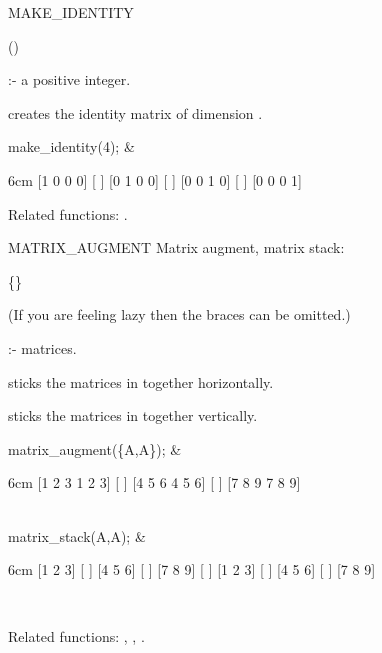 \begin{Operator}[makeidentity]{MAKE_IDENTITY}

\begin{Syntax}
()
\end{Syntax}

 :- a positive integer.

 creates the identity matrix of dimension 
.

\begin{Examples}

make_identity(4); &
\begin{multilineoutput}{6cm}
[1  0  0  0]
[          ]
[0  1  0  0]
[          ]
[0  0  1  0]
[          ]
[0  0  0  1]
\end{multilineoutput}

\end{Examples}

Related functions: .

\end{Operator}


\begin{Operator}[matrixaugment]{MATRIX_AUGMENT}
Matrix augment, matrix stack:

\begin{Syntax}
 \{\}
\end{Syntax}

(If you are feeling lazy then the braces can be omitted.)

 :- matrices.

 sticks the matrices in 
together horizontally. 

 sticks the matrices in  
together vertically.


\begin{Examples}

matrix_augment(\{A,A\}); &
\begin{multilineoutput}{6cm}
[1  2  3  1  2  3]
[                ]
[4  5  6  4  5  6]
[                ]
[7  8  9  7  8  9]
\end{multilineoutput}\\

matrix_stack(A,A); &
\begin{multilineoutput}{6cm}
[1  2  3]
[       ]
[4  5  6]
[       ]
[7  8  9]
[       ]
[1  2  3]
[       ]
[4  5  6]
[       ]
[7  8  9]
\end{multilineoutput} \\

\end{Examples}

Related functions:
, , .

\end{Operator}


